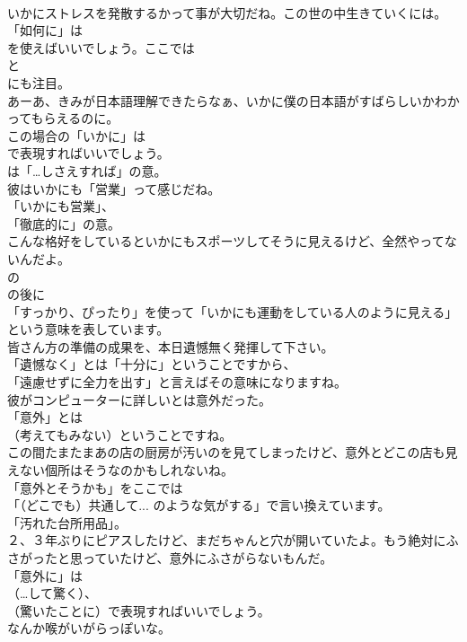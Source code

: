 \documentclass[8pt]{extreport}
\begin{document}
\begin{CJK}{UTF8}{min}
\\	いかにストレスを発散するかって事が大切だね。この世の中生きていくには。 
\\	「如何に」は
\\	を使えばいいでしょう。ここでは
\\	と
\\	にも注目。	
\\	あーあ、きみが日本語理解できたらなぁ、いかに僕の日本語がすばらしいかわかってもらえるのに。 
\\	この場合の「いかに」は 
\\	で表現すればいいでしょう。
\\	は「…しさえすれば」の意。	
\\	彼はいかにも「営業」って感じだね。 
\\	「いかにも営業」、
\\	「徹底的に」の意。	
\\	こんな格好をしているといかにもスポーツしてそうに見えるけど、全然やってないんだよ。 
\\	の
\\	の後に
\\	「すっかり、ぴったり」を使って「いかにも運動をしている人のように見える」という意味を表しています。	
\\	皆さん方の準備の成果を、本日遺憾無く発揮して下さい。 
\\	「遺憾なく」とは「十分に」ということですから、
\\	「遠慮せずに全力を出す」と言えばその意味になりますね。	
\\	彼がコンピューターに詳しいとは意外だった。 
\\	「意外」とは 
\\	（考えてもみない）ということですね。	
\\	この間たまたまあの店の厨房が汚いのを見てしまったけど、意外とどこの店も見えない個所はそうなのかもしれないね。 
\\	「意外とそうかも」をここでは
\\	「（どこでも）共通して... のような気がする」で言い換えています。
\\	「汚れた台所用品」。	
\\	２、３年ぶりにピアスしたけど、まだちゃんと穴が開いていたよ。もう絶対にふさがったと思っていたけど、意外にふさがらないもんだ。 
\\	「意外に」は
\\	（…して驚く）、
\\	（驚いたことに）で表現すればいいでしょう。	
\\	なんか喉がいがらっぽいな。 

\end{CJK}
\end{document}
